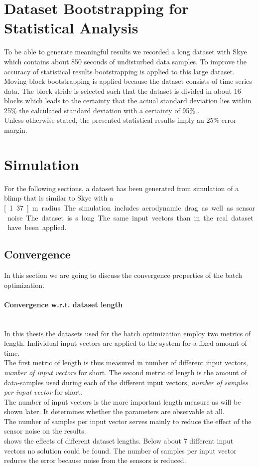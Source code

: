 \section{Dataset Bootstrapping for Statistical Analysis}
\label{sec:bootstrapping_and_statistics}
To be able to generate meaningful results we recorded a long dataset with Skye which contains about 850 seconds of undisturbed data samples.
To improve the accuracy of statistical results bootstrapping is applied to this large dataset.
Moving block bootstrapping is applied because the dataset consists of time series data.
The block stride is selected such that the dataset is divided in about 16 blocks which
leads to the certainty that the actual standard deviation lies within 25\% the calculated standard deviation with a certainty of 95\% \citep{WikiMarginOfError}. \\
Unless otherwise stated, the presented statistical results imply an 25\% error margin.

\section{Simulation}
For the following sections, a dataset has been generated from simulation of a blimp that is similar to Skye with a \unit[1.37]{m} radius.
The simulation includes aerodynamic drag as well as sensor noise.
The dataset is \unit[850]{s} long.
The same input vectors than in the real dataset have been applied.

\subsection{Convergence}
\label{sec:sim_convergence}
In this section we are going to discuss the convergence properties of the batch optimization.

\paragraph{Convergence w.r.t. dataset length} ~\\
In this thesis the datasets used for the batch optimization employ two metrics of length.
Individual input vectors are applied to the system for a fixed amount of time. \\
The first metric of length is thus measured in number of different input vectors, \textit{number of input vectors} for short.
The second metric of length is the amount of data-samples used during each of the different input vectors, \textit{number of samples per input vector} for short. \\
The number of input vectors is the more important length measure as will be shown later.
It determines whether the parameters are observable at all. \\
The number of samples per input vector serves mainly to reduce the effect of the sensor noise on the results. \\
 shows the effects of different dataset lengths.
Below about 7 different input vectors no solution could be found. 
The number of samples per input vector reduces the error because noise from the sensors is reduced.

